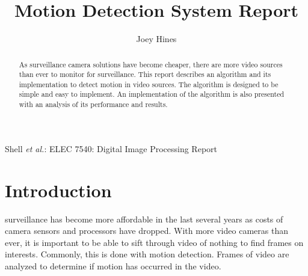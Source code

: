 \documentclass[journal]{IEEEtran}
\begin{document}
%
\title{Motion Detection System Report}
%
%
%

\author{Joey Hines}

%
{Shell \MakeLowercase{\textit{et al.}}: ELEC 7540: Digital Image Processing Report}


\maketitle

\begin{abstract}
As surveillance camera solutions have become cheaper, there are more video sources than ever to monitor
for surveillance. This report describes an algorithm and its implementation to detect motion in video sources.
The algorithm is designed to be simple and easy to implement. An implementation of the algorithm is also
presented with an analysis of its performance and results. 
\end{abstract}


%
\IEEEpeerreviewmaketitle


\section{Introduction}
 surveillance has become more affordable in the last several years as costs of camera 
sensors and processors have dropped. With more video cameras than ever, it is important to be able to sift 
through video of nothing to find frames on interests. Commonly, this is done with motion detection. Frames of 
video are analyzed to determine if motion has
occurred in the video. 
\end{document}
